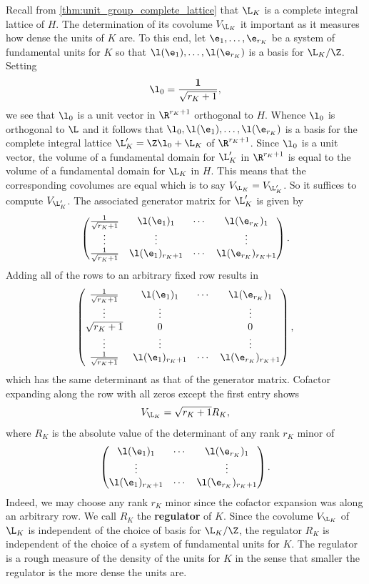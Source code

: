 \documentclass[12pt]{article}
\begin{document}
      Recall from \cref{thm:unit_group_complete_lattice} that \(\L_{K}\) is a complete integral lattice of \(H\). The determination of its covolume \(V_{\L_{K}}\) it important as it measures how dense the units of \(K\) are. To this end, let \(\e_{1},\ldots,\e_{r_{K}}\) be a system of fundamental units for \(K\) so that \(\l(\e_{1}),\ldots,\l(\e_{r_{K}})\) is a basis for \(\L_{K}/\Z\). Setting
      \[
        \l_{0} = \frac{\mathbf{1}}{\sqrt{r_{K}+1}},
      \]
      we see that \(\l_{0}\) is a unit vector in \(\R^{r_{K}+1}\) orthogonal to \(H\). Whence \(\l_{0}\) is orthogonal to \(\L\) and it follows that \(\l_{0},\l(\e_{1}),\ldots,\l(\e_{r_{K}})\) is a basis for the complete integral lattice \(\L_{K}' = \Z\l_{0}+\L_{K}\) of \(\R^{r_{K}+1}\). Since \(\l_{0}\) is a unit vector, the volume of a fundamental domain for \(\L_{K}'\) in \(\R^{r_{K}+1}\) is equal to the volume of a fundamental domain for \(\L_{K}\) in \(H\). This means that the corresponding covolumes are equal which is to say \(V_{\L_{K}} = V_{\L_{K}'}\). So it suffices to compute \(V_{\L_{K}'}\). The associated generator matrix for \(\L_{K}'\) is given by
      \[
        \begin{pmatrix} \frac{1}{\sqrt{r_{K}+1}} & \l(\e_{1})_{1} & \cdots & \l(\e_{r_{K}})_{1} \\ \vdots & \vdots & & \vdots \\ \frac{1}{\sqrt{r_{K}+1}} & \l(\e_{1})_{r_{K}+1} & \cdots & \l(\e_{r_{K}})_{r_{K}+1} \end{pmatrix}.
      \]
      Adding all of the rows to an arbitrary fixed row results in
      \[
        \begin{pmatrix} \frac{1}{\sqrt{r_{K}+1}} & \l(\e_{1})_{1} & \cdots & \l(\e_{r_{K}})_{1} \\ \vdots & \vdots & & \vdots \\ \sqrt{r_{K}+1} & 0 & & 0 \\ \vdots & \vdots & & \vdots \\ \frac{1}{\sqrt{r_{K}+1}} & \l(\e_{1})_{r_{K}+1} & \cdots & \l(\e_{r_{K}})_{r_{K}+1} \end{pmatrix},
      \]
      which has the same determinant as that of the generator matrix. Cofactor expanding along the row with all zeros except the first entry shows
      \[
        V_{\L_{K}} = \sqrt{r_{K}+1}R_{K},
      \]
      where \(R_{K}\) is the absolute value of the determinant of any rank \(r_{K}\) minor of
      \[
        \begin{pmatrix} \l(\e_{1})_{1} & \cdots & \l(\e_{r_{K}})_{1} \\ \vdots & & \vdots \\ \l(\e_{1})_{r_{K}+1} & \cdots & \l(\e_{r_{K}})_{r_{K}+1}  \end{pmatrix}.
      \]
      Indeed, we may choose any rank \(r_{K}\) minor since the cofactor expansion was along an arbitrary row. We call \(R_{K}\) the \textbf{regulator} of \(K\). Since the covolume \(V_{\L_{K}}\) of \(\L_{K}\) is independent of the choice of basis for \(\L_{K}/\Z\), the regulator \(R_{K}\) is independent of the choice of a system of fundamental units for \(K\). The regulator is a rough measure of the density of the units for \(K\) in the sense that smaller the regulator is the more dense the units are.
\end{document}
